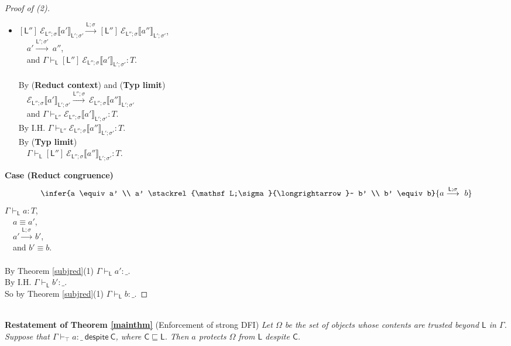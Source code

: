 \documentclass{sigplanconf}
\newcommand{\lab}{\mathsf L}
\newcommand{\labc}{\mathsf C}
\newcommand{\new}[2]{(\nu #1)\:#2}
\newcommand{\action}[1]{\stackrel{#1}{\longrightarrow}~}
\newcommand{\llctx}[3]{\mathcal E_{#1}\llbracket#2\rrbracket_{#3}}
\newcommand{\sctx}[2]{\mathcal E_{\lab;\sigma}\llbracket#1\rrbracket_{#2}}
\newcommand{\trule}[1]{(\textbf{Typ #1})}
\newcommand{\rrule}[1]{\textbf{Reduct #1}}
\begin{document}
\begin{proof}[Proof of (2)]
\begin{itemize}
$~~~$ and $\Gamma \vdash_{\lab''} u : T''$,\\
$~~~$ and $\Gamma, x : T'' \vdash_\lab \sctx{a'}{\lab';\sigma'} : T$.\\
By I.H. $\Gamma, x : T'' \vdash_\lab \sctx{a''}{\lab';\sigma'} : T$.\\
By \trule{substitute} \\
$~~~$ $\Gamma \vdash_\lab \new{x/u@\lab''}{\sctx{a''}{\lab';\sigma'}} : T$.\\
\item $[\lab'']~{\llctx{\lab'';\sigma}{a'}{\lab';\sigma'}} \action{\lab;\sigma} [\lab'']~{\llctx{\lab'';\sigma}{a''}{\lab';\sigma'}}$,\\
$~~~$ $a' \action{\lab';\sigma'} a''$,\\
$~~~$ and $\Gamma \vdash_\lab [\lab'']~{\llctx{\lab'';\sigma}{a'}{\lab';\sigma'}} : T$.\\
\\
By (\rrule{context}) and \trule{limit} \\
$~~~$ $\llctx{\lab'';\sigma}{a'}{\lab';\sigma'} \action{\lab'';\sigma} \llctx{\lab'';\sigma}{a''}{\lab';\sigma'}$\\
$~~~$ and $\Gamma \vdash_{\lab''} \llctx{\lab'';\sigma}{a'}{\lab';\sigma'} : T$.\\
By I.H. $\Gamma \vdash_{\lab''} \llctx{\lab'';\sigma}{a''}{\lab';\sigma'} : T$.\\
By \trule{limit} \\
$~~~$ $\Gamma \vdash_\lab [\lab'']~{\llctx{\lab'';\sigma}{a''}{\lab';\sigma'}} : T$.
\end{itemize}
{\bf Case (Reduct congruence)}
$$\infer
    {a \equiv a' \\ a' \action{\lab;\sigma} b' \\ b' \equiv b}
    {a \action{\lab;\sigma} b}
$$
$\Gamma \vdash_\lab a : T$,\\
$~~~$ $a \equiv a'$,\\
$~~~$ $a' \action{\lab;\sigma} b'$, \\ 
$~~~$ and $b' \equiv b$.\\
\\
By Theorem \ref{subjred}(1) $\Gamma \vdash_\lab a' : \_$.\\
By I.H. $\Gamma \vdash_\lab b' : \_$.\\
So by Theorem \ref{subjred}(1) $\Gamma \vdash_\lab b : \_$.
\end{proof}
$ $\\
{\bf Restatement of Theorem \ref{mainthm}} (Enforcement of strong DFI) {\em Let
  $\Omega$ be the set of objects whose contents are trusted beyond $\lab$ in $\Gamma$. Suppose that $\Gamma
  \vdash_\top a : \_~\mathsf{despite}~\labc$, where $\labc \sqsubseteq \lab$. Then $a$
  protects $\Omega$ from $\lab$ despite $\labc$. 
}
\end{document}
